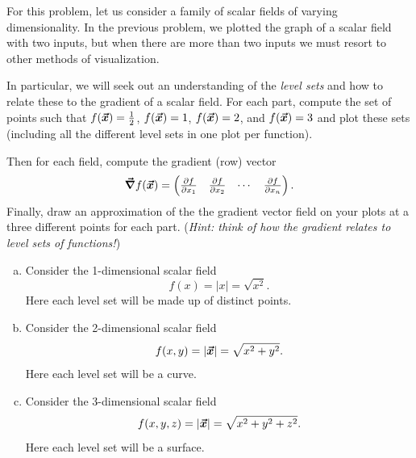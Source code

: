 \documentclass[12pt]{article} %
\begin{document}
\newpage
\begin{problem}
For this problem, let us consider a family of scalar fields of varying dimensionality. In the previous problem, we plotted the graph of a scalar field with two inputs, but when there are more than two inputs we must resort to other methods of visualization.

In particular, we will seek out an understanding of the \emph{level sets} and how to relate these to the gradient of a scalar field. For each part, compute the set of points such that $f(\boldsymbol{\vec{x}})=\frac{1}{2}$, $f(\boldsymbol{\vec{x}})=1$, $f(\boldsymbol{\vec{x}})=2$, and $f(\boldsymbol{\vec{x}})=3$ and plot these sets (including all the different level sets in one plot per function). 

Then for each field, compute the gradient (row) vector
\[
\boldsymbol{\vec{\nabla}} f(\boldsymbol{\vec{x}}) = \begin{pmatrix} \frac{\partial f}{\partial x_1} & \frac{\partial f}{\partial x_2} & \cdots & \frac{\partial f}{\partial x_n}\end{pmatrix}.
\]
Finally, draw an approximation of the the gradient vector field on your plots at a three different points for each part. (\emph{Hint: think of how the gradient relates to level sets of functions!})
\begin{enumerate}[(a)]
	\item Consider the 1-dimensional scalar field 
	\[
	f(x) = |x| = \sqrt{x^2}.
	\]
	Here each level set will be made up of distinct points.
	\item Consider the 2-dimensional scalar field
	\[
	f(x,y) = |\boldsymbol{\vec{x}}| = \sqrt{x^2+y^2}.
	\]
	Here each level set will be a curve.
	\item Consider the 3-dimensional scalar field
		\[
		f(x,y,z) = |\boldsymbol{\vec{x}}| = \sqrt{x^2+y^2+z^2}.
		\]
		Here each level set will be a surface.
\end{enumerate}
\end{problem}
\end{document}
